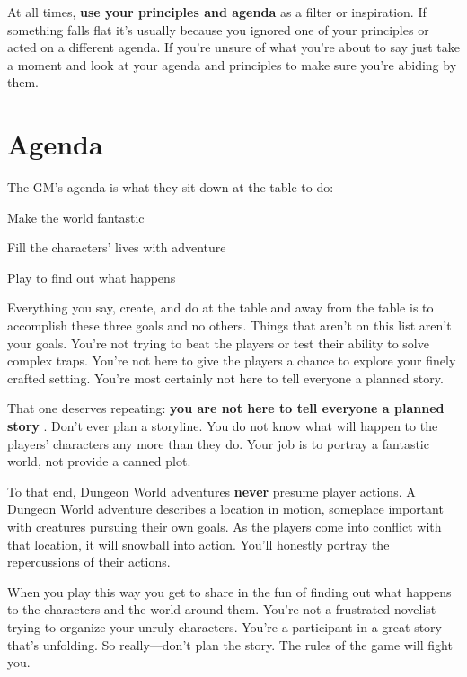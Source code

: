 At all times, {\bf use your principles and agenda}  as a filter or inspiration. If something falls flat it's usually because you ignored one of your principles or acted on a different agenda. If you're unsure of what you're about to say just take a moment and look at your agenda and principles to make sure you're abiding by them.

 
\section{Agenda}   
 

The GM's agenda is what they sit down at the table to do:

 
\startitemize[1,packed]

\item Make the world fantastic

 
\item Fill the characters' lives with adventure

 
\item Play to find out what happens


\stopitemize
 

Everything you say, create, and do at the table and away from the table is to accomplish these three goals and no others. Things that aren't on this list aren't your goals. You're not trying to beat the players or test their ability to solve complex traps. You're not here to give the players a chance to explore your finely crafted setting. You're most certainly not here to tell everyone a planned story.

 

That one deserves repeating: {\bf you are not here to tell everyone a planned story} . Don't ever plan a storyline. You do not know what will happen to the players' characters any more than they do. Your job is to portray a fantastic world, not provide a canned plot.

 

To that end, Dungeon World adventures {\bf never}  presume player actions. A Dungeon World adventure describes a location in motion, someplace important with creatures pursuing their own goals. As the players come into conflict with that location, it will snowball into action. You'll honestly portray the repercussions of their actions.

 

When you play this way you get to share in the fun of finding out what happens to the characters and the world around them. You're not a frustrated novelist trying to organize your unruly characters. You're a participant in a great story that's unfolding. So really—don't plan the story. The rules of the game will fight you.

